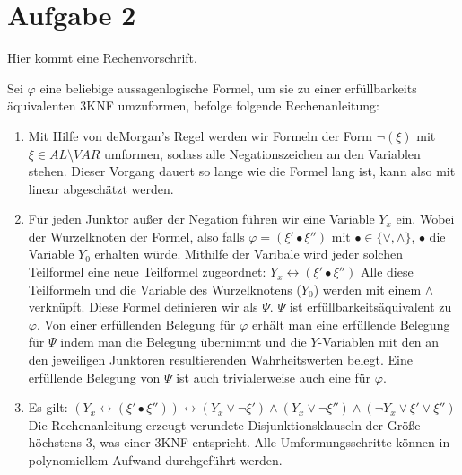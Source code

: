 \documentclass[a4paper,10pt]{article}
\begin{document}
\section*{Aufgabe 2}
	Hier kommt eine Rechenvorschrift.

	Sei $\varphi$ eine beliebige aussagenlogische Formel, um sie zu einer erfüllbarkeits
	\"aquivalenten 3KNF umzuformen, befolge folgende Rechenanleitung:
	\begin{enumerate}
		\item 	Mit Hilfe von deMorgan's Regel werden wir Formeln der Form 
			$\lnot(\xi)$ mit $\xi \in AL\setminus VAR$ umformen, sodass alle 
			Negationszeichen an den Variablen stehen. 
			Dieser Vorgang dauert so lange wie die Formel lang ist, kann also mit
			linear abgeschätzt werden.
		\item   Für jeden Junktor außer der Negation führen wir eine 
			Variable $Y_x$ ein. Wobei der Wurzelknoten der Formel, also falls 
			$\varphi = (\xi' \bullet \xi'') \text{ mit } \bullet \in \{\lor, \land\}$, 
			$\bullet$ die Variable 
			$Y_0$ erhalten würde. Mithilfe der Varibale wird jeder solchen Teilformel 
			eine neue Teilformel zugeordnet: 
			$Y_x \leftrightarrow (\xi' \bullet \xi'')$
			Alle diese Teilformeln und die Variable des Wurzelknotens ($Y_0$) werden mit einem $\land$ verknüpft. Diese 
			Formel definieren wir als $\Psi$. 
			$\Psi$ ist erfüllbarkeitsäquivalent zu 
			$\varphi$. Von einer erfüllenden Belegung für $\varphi$ erhält 
			man eine erfüllende Belegung für $\Psi$ indem man die Belegung 
			übernimmt und die $Y$-Variablen mit den an den jeweiligen Junktoren 
			resultierenden Wahrheitswerten belegt. Eine erfüllende Belegung von 
			$\Psi$ ist auch trivialerweise auch eine für $\varphi$.
		\item	Es gilt: $(Y_x \leftrightarrow (\xi' \bullet \xi'')) 
			\leftrightarrow (Y_x \lor \lnot \xi') \land (Y_x \lor \lnot \xi'') 				\land (\lnot Y_x \lor \xi' \lor \xi'')$
Die Rechenanleitung erzeugt verundete Disjunktionsklauseln der Größe höchstens 3, was einer 3KNF entspricht. Alle Umformungsschritte können in polynomiellem Aufwand durchgeführt werden.
			
	\end{enumerate}
\end{document}
